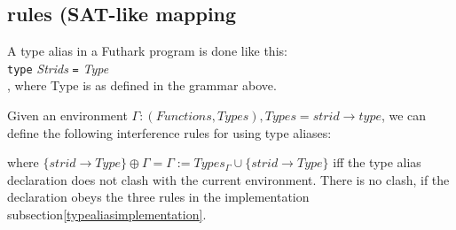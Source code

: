 \subsection{rules (SAT-like mapping }
A type alias in a Futhark program is done like this:\\
\indent \texttt{type} \textit{Strids} \texttt{=} \textit{Type} \\
, where Type is as defined in the grammar above.

\label{typealiasinterference}Given an environment $\Gamma : (Functions, Types), Types = { strid \to type }$,
we can define the following interference rules for using type aliases:

\begin{prooftree}
\end{prooftree}
where
$ \{ strid \to Type \} \oplus \Gamma = \Gamma := Types_{\Gamma} \cup \{strid \to Type\} $ iff the type alias declaration does not
clash with the current environment. There is no clash, if the declaration obeys
the three rules in the implementation subsection\ref{typealiasimplementation}.

\begin{prooftree}
\end{prooftree}

